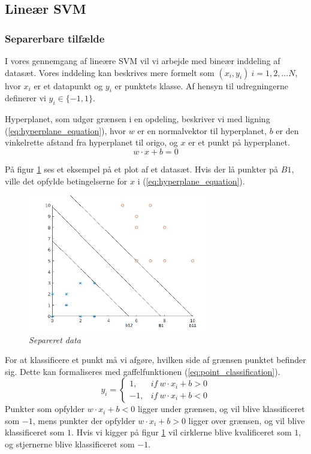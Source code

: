 \documentclass{article}
\begin{document}
\subsection{Lineær SVM}
\subsubsection{Separerbare tilfælde}
I vores gennemgang af lineære SVM vil vi arbejde med bineær inddeling af datasæt. Vores inddeling kan beskrives mere formelt som $(x_i,y_i) \ i=1,2,...N$, hvor $x_i$ er et datapunkt og $y_i$ er punktets klasse. Af hensyn til udregningerne definerer vi $y_i \in \{-1,1\}$.

Hyperplanet, som udgør grænsen i en opdeling, beskriver vi med ligning (\ref{eq:hyperplane_equation}), hvor $w$ er en normalvektor til hyperplanet, $b$ er den vinkelrette afstand fra hyperplanet til origo, og $x$ er et punkt på hyperplanet.
\begin{equation}
\label{eq:hyperplane_equation}
w \cdot x + b = 0
\end{equation}

På figur \ref{fig:hyperplane_example} ses et eksempel på et plot af et datasæt. Hvis der lå punkter på $B1$, ville det opfylde betingelserne for $x$ i (\ref{eq:hyperplane_equation}).
\begin{center}
\begin{figure}[H]
\includegraphics[width=8cm]{svm_plot}
\caption{\textit{Separeret data}}
\label{fig:hyperplane_example}
\end{figure}
\end{center}


For at klassificere et punkt må vi afgøre, hvilken side af grænsen punktet befinder sig. Dette kan formaliseres med gaffelfunktionen (\ref{eq:point_classification}). 
\begin{equation}
\label{eq:point_classification}
y_i = \left\{
\begin{array}{lr}
1, & if \ w \cdot x_i + b > 0 \\
-1, & if \ w \cdot x_i + b < 0
\end{array}
\right.
\end{equation}
Punkter som opfylder $w\cdot x_i + b <0$ ligger under grænsen, og vil blive klassificeret som $-1$, mens punkter der opfylder $w\cdot x_i +b >0$ ligger over grænsen, og vil blive klassificeret som $1$. Hvis vi kigger på figur \ref{fig:hyperplane_example} vil cirklerne blive kvalificeret som $1$, og stjernerne blive klassificeret som $-1$.
\end{document}
